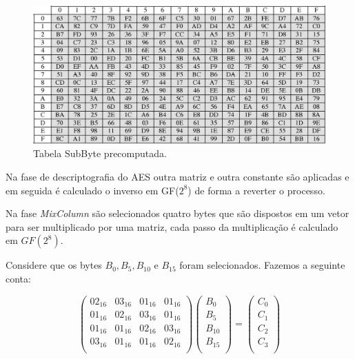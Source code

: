 \begin{figure}[!htp]
  \centering
    \includegraphics[width=\textwidth]{imagens/aes-subbyte.jpg}
  \caption{Tabela SubByte precomputada.}
  \label{fig:subbyte}
\end{figure}

Na fase de descriptografia do AES outra matriz e outra constante são aplicadas e em seguida é calculado o inverso em GF($2^8$) de forma a reverter o processo.

Na fase {\em MixColumn} são selecionados quatro bytes que são dispostos em um vetor para ser multiplicado por uma matriz, cada passo da multiplicação é calculado em $GF(2^8)$.


\begin{example}
  Considere que os bytes $B_0, B_5, B_{10}$ e $B_{15}$ foram selecionados.
  Fazemos a seguinte conta:

\begin{displaymath}
\left(\begin{array}{cccc}
02_{16} & 03_{16} & 01_{16} & 01_{16} \\
01_{16} & 02_{16} & 03_{16} & 01_{16} \\
01_{16} & 01_{16} & 02_{16} & 03_{16} \\
03_{16} & 01_{16} & 01_{16} & 02_{16} \\
\end{array} \right) 
\left( \begin{array}{c}
B_0\\ B_5\\ B_{10}\\ B_{15}\\\end{array} \right)
=
\left( \begin{array}{c}
C_0\\ C_1\\ C_2\\ C_3\\\end{array} \right)
\end{displaymath}  
\end{example}

